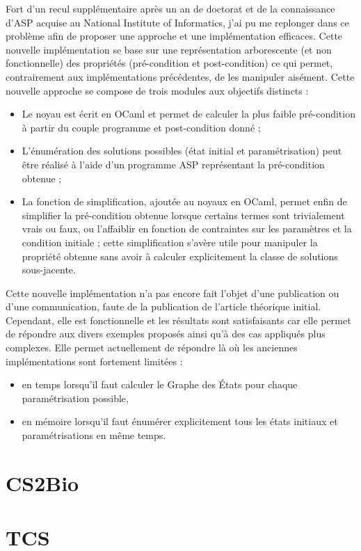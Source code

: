 Fort d'un recul supplémentaire après un an de doctorat et de la connaissance d'ASP acquise au National Institute of Informatics, j'ai pu me replonger dans ce problème afin de proposer une approche et une implémentation efficaces.
Cette nouvelle implémentation se base sur une représentation arborescente (et non fonctionnelle) des propriétés (pré-condition et post-condition) ce qui permet, contrairement aux implémentations précédentes, de les manipuler aisément.
Cette nouvelle approche se compose de trois modules aux objectifs distincts :
\begin{itemize}
  \item Le noyau est écrit en OCaml et permet de calculer la plus faible pré-condition à partir du couple programme et post-condition donné ;
  \item L'énumération des solutions possibles (état initial et paramétrisation) peut être réalisé à l'aide d'un programme ASP représentant la pré-condition obtenue ;
  \item La fonction de simplification, ajoutée au noyaux en OCaml, permet enfin de simplifier la pré-condition obtenue lorsque certains termes sont trivialement vrais ou faux, ou l'affaiblir en fonction de contraintes sur les paramètres et la condition initiale ; cette simplification s'avère utile pour manipuler la propriété obtenue sans avoir à calculer explicitement la classe de solutions sous-jacente.
\end{itemize}

Cette nouvelle implémentation n'a pas encore fait l'objet d'une publication ou d'une communication, faute de la publication de l'article théorique initial.
Cependant, elle est fonctionnelle et les résultats sont satisfaisants car elle permet de répondre aux divers exemples proposés ainsi qu'à des cas appliqués plus complexes.
Elle permet actuellement de répondre  là où les anciennes implémentations sont fortement limitées :
\begin{itemize}
  \item en temps lorsqu'il faut calculer le Graphe des États pour chaque paramétrisation possible,
  \item en mémoire lorsqu'il faut énumérer explicitement tous les états initiaux et paramétrisations en même temps.
\end{itemize}

\section{CS2Bio}
\label{sec:cs2bio}

\section{TCS}
